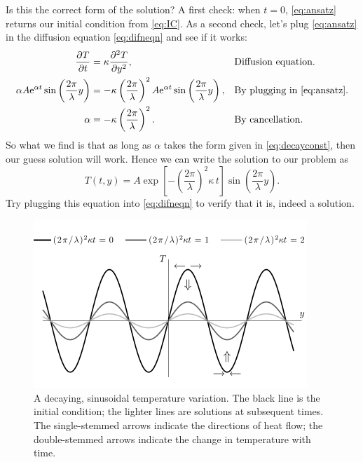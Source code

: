 \documentclass[11pt,twoside,a4paper]{article}
\begin{document}
Is this the correct form of the solution?  A first check: when $t=0$,
\autoref{eq:ansatz} returns our initial condition from
\autoref{eq:IC}.  As a second check, let's plug \autoref{eq:ansatz} in
the diffusion equation \eqref{eq:difneqn} and see if it works:
\begin{align}
  \frac{\partial T}{\partial t} &= \kappa\frac{\partial^2 {T}}{\partial {y}^2}, &&\text{Diffusion equation.}\nonumber\\
  \alpha A\textrm{e}^{\alpha t}\sin\left(\frac{2\pi}{\lambda}y\right) &= 
                                                                  -\kappa\left(\frac{2\pi}{\lambda}\right)^2A\textrm{e}^{\alpha
                                                                  t}\sin\left(\frac{2\pi}{\lambda}y\right),&&\text{By plugging in \eqref{eq:ansatz}.}\nonumber\\
  \label{eq:decayconst}
  \alpha &= -\kappa\left(\frac{2\pi}{\lambda}\right)^2.&&\text{By cancellation.}
\end{align}
So what we find is that as long as $\alpha$ takes the form given in
\autoref{eq:decayconst}, then our guess solution will work.  Hence we
can write the solution to our problem as
\begin{equation}
  \label{eq:soln1}
  T(t,y) = A\exp\left[-\left(\frac{2\pi}{\lambda}\right)^2\kappa\, t\right]
  \sin\left(\frac{2\pi}{\lambda}y\right).
\end{equation}
Try plugging this equation into \autoref{eq:difneqn} to verify that it
is, indeed a solution.

\begin{figure}[ht]
  \centering
  \includegraphics[height=2.5in]{../figs/L18/decayOscillations}
  \caption{A decaying, sinusoidal temperature variation. The black
    line is the initial condition; the lighter lines are solutions at
    subsequent times. The single-stemmed arrows indicate the
    directions of heat flow; the double-stemmed arrows indicate the
    change in temperature with time.}
  \label{fig:decayosc}
\end{figure}
\end{document}
